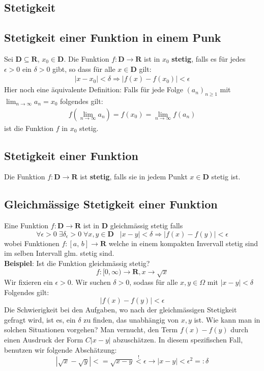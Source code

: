 \documentclass[8pt]{article}
\begin{document}
\begin{multicols*}{3}
\section{Stetigkeit}
\hypertarget{sec:2}{}

\subsection{Stetigkeit einer Funktion in einem Punk}

Sei $\mathbf{D} \subseteq \mathbf{R}$, $x_0 \in \mathbf{D}$. Die Funktion
$f: \mathbf{D} \rightarrow \mathbf{R}$ ist in $x_0$ \textbf{stetig}, falls
es für jedes $\epsilon > 0$ ein $\delta > 0$ gibt, so dass für alle $x \in \mathbf{D}$
gilt:
\begin{align*}
  |x - x_0| < \delta \Rightarrow |f(x) - f(x_0)| < \epsilon 
\end{align*}
Hier noch eine äquivalente Definition: Falls für jede Folge $(a_n)_{n \geq 1}$ mit
$\lim_{n \rightarrow \infty} a_n = x_0$ folgendes gilt:
\begin{align*}
  f(\lim_{n \rightarrow \infty} a_n) = f(x_0) = \lim_{n \rightarrow \infty} f(a_n)
\end{align*}
ist die Funktion $f$ in $x_0$ stetig.

\subsection{Stetigkeit einer Funktion}

Die Funktion $f: \mathbf{D} \rightarrow \mathbf{R}$ ist \textbf{stetig}, falls sie
in jedem Punkt $x \in \mathbf{D}$ stetig ist.

\subsection{Gleichmässige Stetigkeit einer Funktion}

Eine Funktion $f:\mathbf{D} \rightarrow \mathbf{R}$ ist in $\mathbf{D}$ gleichmässig
stetig falls $$ \forall \epsilon > 0 \; \exists \delta_{\epsilon} > 0 \;\forall x, y \in \mathbf{D}\;\;\; |x-y| < \delta \Rightarrow |f(x) - f(y)| < \epsilon $$
wobei Funktionen $f:[a,\,b] \rightarrow \mathbf{R}$ welche in einem kompakten Invervall stetig sind im selben Intervall glm. stetig sind.\\
\textbf{Beispiel}: Ist die Funktion gleichmässig stetig? 
$$
f: [0, \infty)  \rightarrow \mathbf{R}, x \rightarrow \sqrt{x}
$$
Wir fixieren ein $\epsilon > 0$. Wir suchen $\delta > 0$, sodass für alle $x, y \in \Omega$ mit $|x - y| < \delta$ Folgendes gilt:
$$
|f(x) - f(y)| < \epsilon
$$
Die Schwierigkeit bei den Aufgaben, wo nach der gleichmässigen Stetigkeit gefragt wird, ist es, ein $\delta$ zu finden, das unabhängig von $x, y$ ist. Wie kann man in solchen Situationen vorgehen? Man vernucht, den Term $f(x) - f(y)$ durch einen Ausdruck der Form $C|x - y|$ abzuschätzen. In diesem spezifischen Fall, benutzen wir folgende Abschätzung:
$$
|\sqrt{x} - \sqrt{y}| <= \sqrt{x - y} \overset{!}{<} \epsilon \rightarrow |x - y| < \epsilon^2 =: \delta
$$


\end{multicols*}
\end{document}

